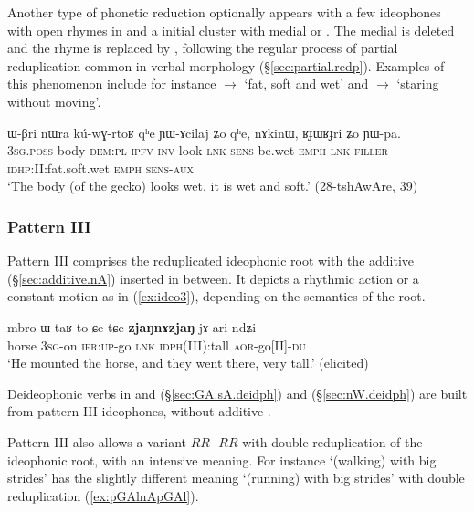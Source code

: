 Another type of phonetic reduction optionally appears with a few ideophones with open rhymes in  and a initial cluster with medial  or . The medial is deleted and the rhyme is replaced by , following the regular process of partial reduplication common in verbal morphology (§\ref{sec:partial.redp}). Examples of this phenomenon include for instance  $\rightarrow$  `fat, soft and wet' and   $\rightarrow$  `staring without moving'.

  \begin{exe} 
\ex  \label{ex:RJWRJri}
\gll ɯ-βri nɯra kú-wɣ-rtoʁ qʰe ɲɯ-ɤcilaj ʑo qʰe, nɤkinɯ, ʁɟɯʁɟri ʑo ɲɯ-pa. \\
\textsc{3sg}.\textsc{poss}-body \textsc{dem}:\textsc{pl} \textsc{ipfv}-\textsc{inv}-look \textsc{lnk} \textsc{sens}-be.wet \textsc{emph} \textsc{lnk} \textsc{filler} \textsc{idhp}:II:fat.soft.wet \textsc{emph} \textsc{sens}-\textsc{aux} \\
\glt `The body (of the gecko) looks wet, it is wet and soft.' (28-tshAwAre, 39)
  \end{exe}

\subsubsection{Pattern III} \label{sec:ideo.III}
  Pattern III comprises the reduplicated ideophonic root with the additive   (§\ref{sec:additive.nA}) inserted in between. It depicts a rhythmic action  or a constant motion as in (\ref{ex:ideo3}), depending on the semantics of the root.   
  
 \begin{exe} 
\ex  \label{ex:ideo3}
\gll  mbro ɯ-taʁ to-ɕe tɕe \textbf{zjaŋnɤzjaŋ} jɤ-ari-ndʑi   \\
horse \textsc{3sg}-on  \textsc{ifr}:\textsc{up}-go \textsc{lnk} \textsc{idph}(III):tall  \textsc{aor}-go[II]-\textsc{du} \\
\glt `He mounted the horse, and  they went there, very tall.'  (elicited)
 \end{exe} 
 
 Deideophonic verbs in  and  (§\ref{sec:GA.sA.deidph}) and  (§\ref{sec:nW.deidph}) are built from pattern III ideophones, without additive .
 
  Pattern III also allows a variant $RR$--$RR$ with double reduplication of the ideophonic root, with an intensive meaning. For instance  `(walking) with big strides' has the slightly different meaning `(running) with big strides' with double reduplication (\ref{ex:pGAlnApGAl}).
  
